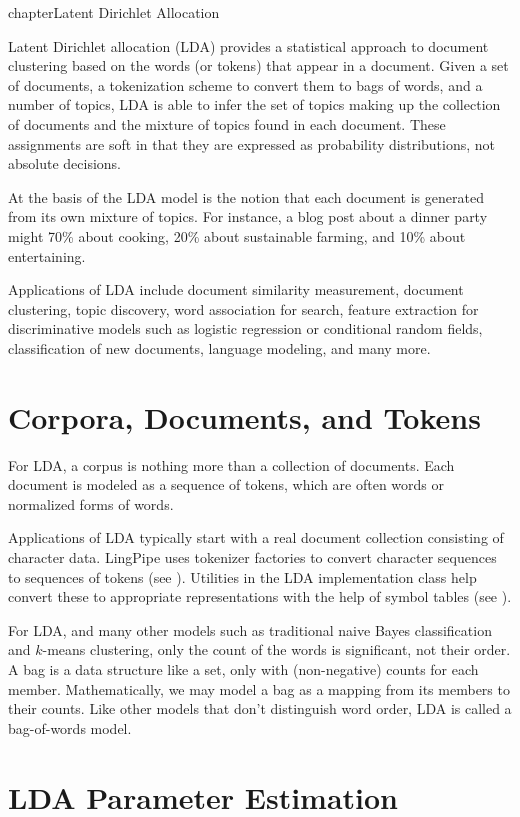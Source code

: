 chapter{Latent Dirichlet Allocation}\label{chapter:lda}

Latent Dirichlet allocation (LDA) provides a statistical approach to
document clustering based on the words (or tokens) that appear in a
document.  Given a set of documents, a tokenization scheme to convert
them to bags of words, and a number of topics, LDA is able to infer
the set of topics making up the collection of documents and the
mixture of topics found in each document.  These assignments are soft
in that they are expressed as probability distributions, not absolute
decisions.

At the basis of the LDA model is the notion that each document is
generated from its own mixture of topics.  For instance, a blog post
about a dinner party might 70\% about cooking, 20\% about sustainable
farming, and 10\% about entertaining.

Applications of LDA include document similarity measurement, document
clustering, topic discovery, word association for search, feature
extraction for discriminative models such as logistic regression or
conditional random fields, classification of new documents, language
modeling, and many more.

\section{Corpora, Documents, and Tokens}

For LDA, a corpus is nothing more than a collection of documents.
Each document is modeled as a sequence of tokens, which are often
words or normalized forms of words.

Applications of LDA typically start with a real document collection
consisting of character data.  LingPipe uses tokenizer factories to
convert character sequences to sequences of tokens (see
).  Utilities in the LDA implementation class
help convert these to appropriate representations with the help of
symbol tables (see ).

For LDA, and many other models such as traditional naive Bayes
classification and $k$-means clustering, only the count of the words
is significant, not their order.  A bag is a data structure like a
set, only with (non-negative) counts for each member.  Mathematically,
we may model a bag as a mapping from its members to their counts. Like
other models that don't distinguish word order, LDA is called a
bag-of-words model.


\section{LDA Parameter Estimation}

